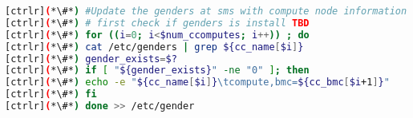 
 
 \begin{lstlisting}[language=bash,keywords={}]
[ctrlr](*\#*) #Update the genders at sms with compute node information
[ctrlr](*\#*) # first check if genders is install TBD
[ctrlr](*\#*) for ((i=0; i<$num_ccomputes; i++)) ; do
[ctrlr](*\#*) cat /etc/genders | grep ${cc_name[$i]}
[ctrlr](*\#*) gender_exists=$?
[ctrlr](*\#*) if [ "${gender_exists}" -ne "0" ]; then 
[ctrlr](*\#*) echo -e "${cc_name[$i]}\tcompute,bmc=${cc_bmc[$i+1]}"
[ctrlr](*\#*) fi
[ctrlr](*\#*) done >> /etc/gender
 \end{lstlisting}
 
